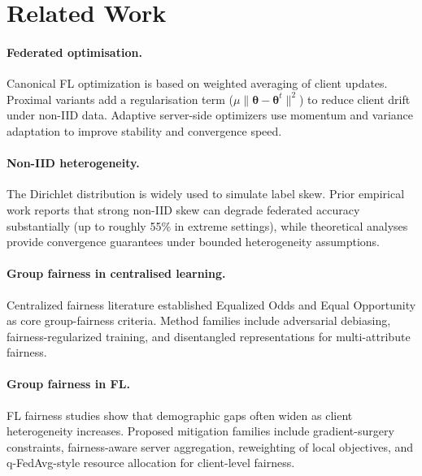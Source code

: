 ﻿\documentclass{article}
\newcommand{\params}{\boldsymbol{\theta}}%
\begin{document}
\section{Related Work}
\label{sec:related}

\paragraph{Federated optimisation.}
Canonical FL optimization is based on weighted averaging of client
updates.
Proximal variants add a regularisation term
($\mu\|\params - \params^t\|^2$) to reduce client drift under
non-IID data.
Adaptive server-side optimizers use momentum and variance adaptation to
improve stability and convergence speed.

\paragraph{Non-IID heterogeneity.}
The Dirichlet distribution is widely used to simulate label
skew.
Prior empirical work reports that strong non-IID skew can degrade
federated accuracy substantially (up to roughly 55\% in extreme
settings), while theoretical analyses provide convergence guarantees
under bounded heterogeneity assumptions.

\paragraph{Group fairness in centralised learning.}
Centralized fairness literature established Equalized Odds and Equal
Opportunity as core group-fairness criteria.
Method families include adversarial debiasing, fairness-regularized
training, and disentangled representations for multi-attribute
fairness.

\paragraph{Group fairness in FL.}
FL fairness studies show that demographic gaps often widen as client
heterogeneity increases.
Proposed mitigation families include gradient-surgery constraints,
fairness-aware server aggregation, reweighting of local objectives, and
q-FedAvg-style resource allocation for client-level fairness.
\end{document}
